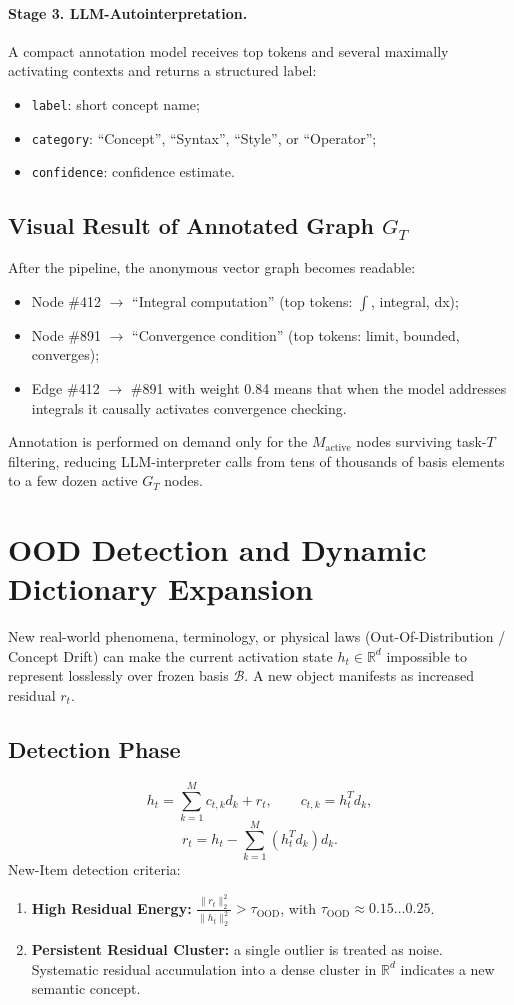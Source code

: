 \documentclass[11pt,a4paper]{article}
\begin{document}
\paragraph{Stage 3. LLM-Autointerpretation.}
A compact annotation model receives top tokens and several maximally activating contexts and returns a structured label:
\begin{itemize}
\item \texttt{label}: short concept name;
\item \texttt{category}: ``Concept'', ``Syntax'', ``Style'', or ``Operator'';
\item \texttt{confidence}: confidence estimate.
\end{itemize}

\subsection*{Visual Result of Annotated Graph $G_T$}
After the pipeline, the anonymous vector graph becomes readable:
\begin{itemize}
\item Node \#412 $\rightarrow$ ``Integral computation'' (top tokens: $\int$, integral, dx);
\item Node \#891 $\rightarrow$ ``Convergence condition'' (top tokens: limit, bounded, converges);
\item Edge \#412 $\rightarrow$ \#891 with weight 0.84 means that when the model addresses integrals it causally activates convergence checking.
\end{itemize}
Annotation is performed on demand only for the $M_{\text{active}}$ nodes surviving task-$T$ filtering, reducing LLM-interpreter calls from tens of thousands of basis elements to a few dozen active $G_T$ nodes.

\section{OOD Detection and Dynamic Dictionary Expansion}
New real-world phenomena, terminology, or physical laws (Out-Of-Distribution / Concept Drift) can make the current activation state $h_t\in\mathbb R^d$ impossible to represent losslessly over frozen basis $\mathcal B$. A new object manifests as increased residual $r_t$.

\subsection*{Detection Phase}
\[h_t=\sum_{k=1}^Mc_{t,k}d_k+r_t,\qquad c_{t,k}=h_t^Td_k,\]
\[r_t=h_t-\sum_{k=1}^M(h_t^Td_k)d_k.\]
New-Item detection criteria:
\begin{enumerate}
\item \textbf{High Residual Energy:} $\frac{\|r_t\|_2^2}{\|h_t\|_2^2}>\tau_{\text{OOD}}$, with $\tau_{\text{OOD}}\approx0.15\ldots0.25$.
\item \textbf{Persistent Residual Cluster:} a single outlier is treated as noise. Systematic residual accumulation into a dense cluster in $\mathbb R^d$ indicates a new semantic concept.
\end{enumerate}
\end{document}
